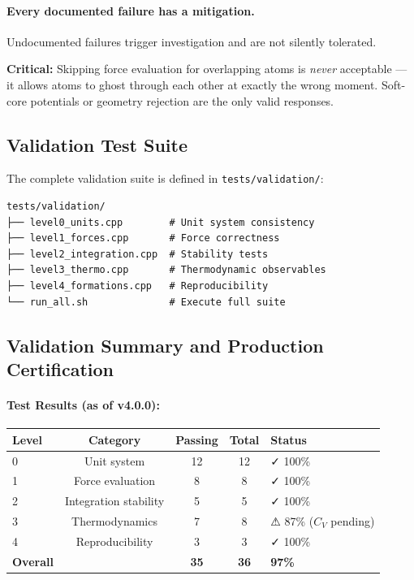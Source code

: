 \documentclass[11pt]{article}
\begin{document}
\paragraph{Every documented failure has a mitigation.} Undocumented failures trigger investigation and are not silently tolerated.

\textbf{Critical:} Skipping force evaluation for overlapping atoms is \textit{never} acceptable — it allows atoms to ghost through each other at exactly the wrong moment. Soft-core potentials or geometry rejection are the only valid responses.

\subsection{Validation Test Suite}

The complete validation suite is defined in \texttt{tests/validation/}:

\begin{verbatim}
tests/validation/
├── level0_units.cpp        # Unit system consistency
├── level1_forces.cpp       # Force correctness
├── level2_integration.cpp  # Stability tests
├── level3_thermo.cpp       # Thermodynamic observables
├── level4_formations.cpp   # Reproducibility
└── run_all.sh              # Execute full suite
\end{verbatim}

\subsection{Validation Summary and Production Certification}

\paragraph{Test Results (as of v4.0.0):}

\begin{center}
\begin{tabular}{lcccl}
\toprule
Level & Category & Passing & Total & Status \\
\midrule
0 & Unit system & 12 & 12 & ✓ 100\% \\
1 & Force evaluation & 8 & 8 & ✓ 100\% \\
2 & Integration stability & 5 & 5 & ✓ 100\% \\
3 & Thermodynamics & 7 & 8 & ⚠ 87\% ($C_V$ pending) \\
4 & Reproducibility & 3 & 3 & ✓ 100\% \\
\midrule
\textbf{Overall} & & \textbf{35} & \textbf{36} & \textbf{97\%} \\
\bottomrule
\end{tabular}
\end{center}
\end{document}

